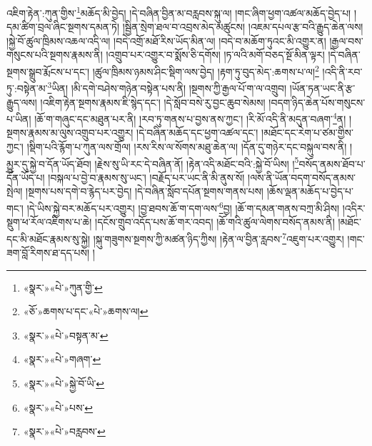 འཇིག་རྟེན་:ཀུན་གྱིས་\footnote{«སྣར་»«པེ་»ཀུན་གྱི་}མཆོད་མི་བྱེད། །དེ་བཞིན་བྱིན་མ་བརླབས་སྐུ་ལ། །གང་ཞིག་ཕྱག་འཚལ་མཆོད་བྱེད་པ། །དམ་ཚིག་བྲལ་ཞིང་སྔགས་དམན་ཏེ། །སྦྱིན་སྲེག་ཐལ་བ་འབྲས་མེད་མཚུངས། །འཇམ་དཔལ་རྩ་བའི་རྒྱུད་ཆེན་ལས། །སྐྱེ་བོ་ཚུལ་ཁྲིམས་འཆལ་འདི་ལ། །བདེ་འགྲོ་མཐོ་རིས་ཡོད་མིན་ལ། །བདེ་བ་མཆོག་ཏུའང་མི་འགྱུར་ན། །རྒྱལ་བས་གསུངས་པའི་སྔགས་རྣམས་ནི། །འགྲུབ་པར་འགྱུར་བ་སྨོས་ཅི་དགོས། །ཏ་ལའི་མགོ་བཅད་སྔོ་མིན་ལྟར། །དེ་བཞིན་སྔགས་སྒྲུབ་རྨོངས་པ་དང་། །ཚུལ་ཁྲིམས་ཉམས་ཤིང་སྡིག་ལས་བྱེད། །རྟག་ཏུ་བུད་མེད་:ཆགས་པ་ལ།\footnote{«ཅོ་»ཆགས་པ་དང་«པེ་»ཆགས་ལ།} །འདི་ནི་རབ་ཏུ་:བསྟེན་མ་\footnote{«སྣར་»«པེ་»བསྟན་མ་}ཡིན། །མི་དགེ་བཤེས་གཉེན་བསྟེན་པས་ནི། །སྔགས་ཀྱི་རྒྱལ་པོ་ག་ལ་འགྲུབ། །ཡོན་ཏན་ཡང་ནི་རྩ་རྒྱུད་ལས། །འཇིག་རྟེན་སྔགས་རྣམས་ཇི་སྙེད་དང་། །དེ་སློབ་བསེ་རུ་བྱང་ཆུབ་སེམས། །བདག་ཉིད་ཆེན་པོས་གསུངས་པ་ཡིན། །ཆོ་ག་གཞུང་དང་མཐུན་པར་ནི། །རབ་ཏུ་གནས་པ་བྱས་ནས་ཀྱང་། །རི་མོ་འདི་ནི་མདུན་བཞག་\footnote{«སྣར་»«པེ་»གཞག་}ན། །སྔགས་རྣམས་མ་ལུས་འགྲུབ་པར་འགྱུར། །དེ་བཞིན་མཆོད་དང་ཕྱག་འཚལ་དང་། །མཐོང་དང་རེག་པ་ཙམ་གྱིས་ཀྱང་། །སྡིག་པའི་རྙོག་པ་ཀུན་ལས་གྲོལ། །རས་རིས་ལ་སོགས་མཐུ་ཆེན་ལ། །དོན་དུ་གཉེར་དང་བསྐུལ་བས་ནི། །མྱུར་དུ་སྐྱེ་བ་དོན་ཡོད་ཐོབ། །རྗེས་སུ་ཡི་རང་དེ་བཞིན་ནོ། །རྟེན་འདི་མཐོང་བའི་:སྐྱེ་བོ་ཡིས། །\footnote{«སྣར་»«པེ་»སྐྱེ་བོ་ཡི་}བསོད་ནམས་ཐོབ་པ་དོན་ཡོད་པ། །བསྐལ་པ་བྱེ་བ་རྣམས་སུ་ཡང་། །བརྗོད་པར་ཡང་ནི་མི་ནུས་སོ། །ལས་ནི་ཡོན་བདག་བསོད་ནམས་སྤེལ། །སྔགས་པས་དགེ་བ་རྙེད་པར་བྱེད། །དེ་བཞིན་སློབ་དཔོན་སྔགས་གནས་པས། །ཆོས་ལྡན་མཆོད་པ་བྱེད་པ་གང་། །དེ་ཡིས་སྐྱེ་བར་མཆོད་པར་འགྱུར། །བྱ་ཐབས་ཆོ་ག་དག་ལས་\footnote{«སྣར་»«པེ་»པས་}བྱ། །ཆོ་ག་དམན་གནས་བཀྲ་མི་ཤིས། །འདིར་སྡུག་ཕ་རོལ་འཇིགས་པ་ཆེ། །དངོས་གྲུབ་འདོད་པས་ཆོ་གར་འབད། །ཆོ་གའི་ཚུལ་ལེགས་བསོད་ནམས་ནི། །མཐོང་དང་མི་མཐོང་རྣམས་སུ་སྐྱེ། །སྐུ་གཟུགས་སྔགས་ཀྱི་མཚན་ཉིད་ཀྱིས། །རྟེན་ལ་བྱིན་རླབས་\footnote{«སྣར་»«པེ་»བརླབས་}འཇུག་པར་འགྱུར། །གང་ཟག་བློ་རིགས་ཐ་དད་པས། །
